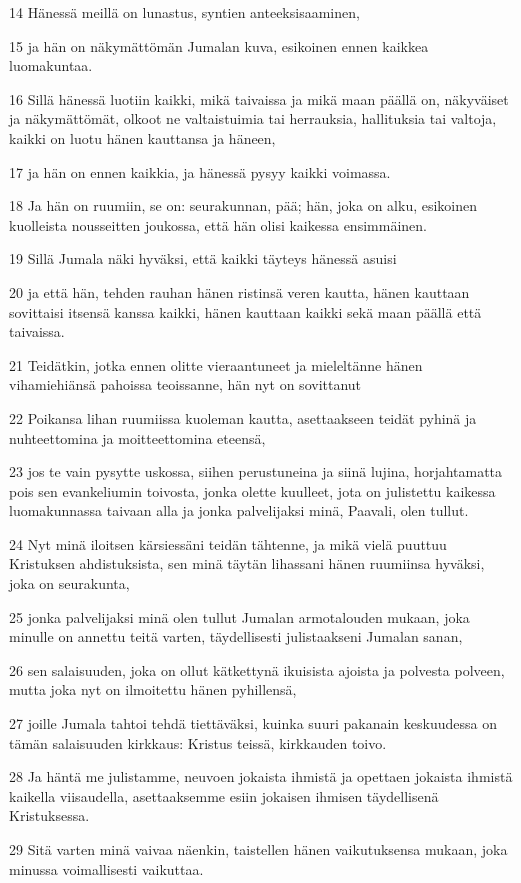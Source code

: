 \par 14 Hänessä meillä on lunastus, syntien anteeksisaaminen,
\par 15 ja hän on näkymättömän Jumalan kuva, esikoinen ennen kaikkea luomakuntaa.
\par 16 Sillä hänessä luotiin kaikki, mikä taivaissa ja mikä maan päällä on, näkyväiset ja näkymättömät, olkoot ne valtaistuimia tai herrauksia, hallituksia tai valtoja, kaikki on luotu hänen kauttansa ja häneen,
\par 17 ja hän on ennen kaikkia, ja hänessä pysyy kaikki voimassa.
\par 18 Ja hän on ruumiin, se on: seurakunnan, pää; hän, joka on alku, esikoinen kuolleista nousseitten joukossa, että hän olisi kaikessa ensimmäinen.
\par 19 Sillä Jumala näki hyväksi, että kaikki täyteys hänessä asuisi
\par 20 ja että hän, tehden rauhan hänen ristinsä veren kautta, hänen kauttaan sovittaisi itsensä kanssa kaikki, hänen kauttaan kaikki sekä maan päällä että taivaissa.
\par 21 Teidätkin, jotka ennen olitte vieraantuneet ja mieleltänne hänen vihamiehiänsä pahoissa teoissanne, hän nyt on sovittanut
\par 22 Poikansa lihan ruumiissa kuoleman kautta, asettaakseen teidät pyhinä ja nuhteettomina ja moitteettomina eteensä,
\par 23 jos te vain pysytte uskossa, siihen perustuneina ja siinä lujina, horjahtamatta pois sen evankeliumin toivosta, jonka olette kuulleet, jota on julistettu kaikessa luomakunnassa taivaan alla ja jonka palvelijaksi minä, Paavali, olen tullut.
\par 24 Nyt minä iloitsen kärsiessäni teidän tähtenne, ja mikä vielä puuttuu Kristuksen ahdistuksista, sen minä täytän lihassani hänen ruumiinsa hyväksi, joka on seurakunta,
\par 25 jonka palvelijaksi minä olen tullut Jumalan armotalouden mukaan, joka minulle on annettu teitä varten, täydellisesti julistaakseni Jumalan sanan,
\par 26 sen salaisuuden, joka on ollut kätkettynä ikuisista ajoista ja polvesta polveen, mutta joka nyt on ilmoitettu hänen pyhillensä,
\par 27 joille Jumala tahtoi tehdä tiettäväksi, kuinka suuri pakanain keskuudessa on tämän salaisuuden kirkkaus: Kristus teissä, kirkkauden toivo.
\par 28 Ja häntä me julistamme, neuvoen jokaista ihmistä ja opettaen jokaista ihmistä kaikella viisaudella, asettaaksemme esiin jokaisen ihmisen täydellisenä Kristuksessa.
\par 29 Sitä varten minä vaivaa näenkin, taistellen hänen vaikutuksensa mukaan, joka minussa voimallisesti vaikuttaa.

